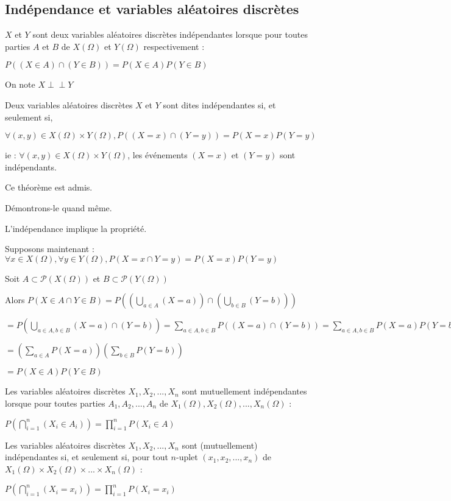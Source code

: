 \documentclass[a4paper,12pt]{book}
\newcommand{\Def}[2]{\begin{tcolorbox}[sharp corners, colback=white,colframe=blue!90!black!75, title=Définition : #1]#2\end{tcolorbox}}
\newcommand{\Thr}[2]{\begin{tcolorbox}[sharp corners, colback=white,colframe=red!90!black!75, title=Théorème : #1]#2\end{tcolorbox}}
\newcommand{\Pre}[1]{\begin{tcolorbox}[sharp corners, colback=white,colframe=green!60!green!30!black!75, title=Preuve]#1\end{tcolorbox}}
\newcommand{\ind}{\perp\!\!\!\!\perp}
\begin{document}
\subsection{Indépendance et variables aléatoires discrètes}
\Def{}{$X$ et $Y$ sont deux variables aléatoires discrètes indépendantes lorsque pour toutes parties $A$ et $B$ de $X(\Omega)$ et $Y(\Omega)$ respectivement :
\par\begin{center}$P((X\in A)\cap (Y\in B))=P(X\in A)P(Y\in B)$\end{center}
\par On note $X\ind Y$}
\Thr{}{Deux variables aléatoires discrètes $X$ et $Y$ sont dites indépendantes si, et seulement si,
\par\begin{center}$\forall (x,y)\in X(\Omega)\times Y(\Omega), P((X=x)\cap (Y=y))=P(X=x)P(Y=y)$\end{center}
\par ie : $\forall (x,y)\in X(\Omega)\times Y(\Omega)$, les événements $(X=x)$ et $(Y=y)$ sont indépendants.}
\Pre{Ce théorème est admis.
\par Démontrons-le quand même.
\par L'indépendance implique la propriété.
\par Supposons maintenant : $\forall x\in X(\Omega), \forall y\in Y(\Omega), P(X=x\cap Y=y)=P(X=x)P(Y=y)$
\par Soit $A\subset\mathcal{P}(X(\Omega))$ et $B\subset \mathcal{P}(Y(\Omega))$
\par Alors $P(X\in A\cap Y\in B) = P\left((\bigcup_{a\in A}(X=a))\cap (\bigcup_{b\in B}(Y=b))\right)$
\par $ = P\left(\bigcup_{a\in A, b\in B}(X=a)\cap(Y=b) \right) = \sum\limits_{a\in A, b\in B}P((X=a)\cap (Y=b)) = \sum\limits_{a\in A, b\in B}P(X=a)P(Y=b)$
\par $ = \left(\sum\limits_{a\in A}P(X=a)\right)\left(\sum\limits_{b\in B}P(Y=b)\right)$
\par $ =P(X\in A)P(Y\in B)$}
\Def{}{Les variables aléatoires discrètes $X_1,X_2,...,X_n$ sont mutuellement indépendantes lorsque pour toutes parties $A_1,A_2,...,A_n$ de $X_1(\Omega),X_2(\Omega),...,X_n(\Omega)$ :
\par\begin{center}$P\left(\bigcap_{i=1}^n(X_i\in A_i)\right)=\prod\limits_{i=1}^nP(X_i\in A)$ \end{center}}
\Thr{}{Les variables aléatoires discrètes $X_1,X_2,...,X_n$ sont (mutuellement) indépendantes si, et seulement si, pour tout $n$-uplet $(x_1,x_2,...,x_n)$ de $X_1(\Omega)\times X_2(\Omega)\times...\times X_n(\Omega)$ :
\par\begin{center}$P\left(\bigcap_{i=1}^n(X_i=x_i)\right)=\prod\limits_{i=1}^nP(X_i=x_i)$\end{center}}
\end{document}
